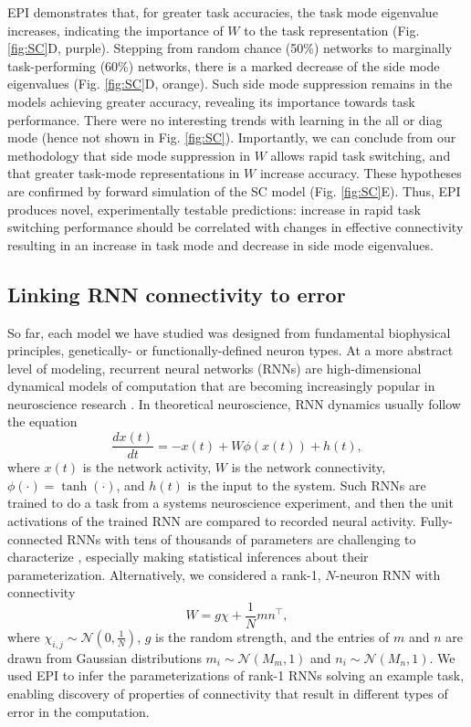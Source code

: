 \documentclass[11pt]{article}
\begin{document}
EPI demonstrates that, for greater task accuracies, the task mode eigenvalue increases, indicating the importance of $W$ to the task representation (Fig. \ref{fig:SC}D, purple).  Stepping from random chance (50\%) networks to marginally task-performing (60\%) networks, there is a marked decrease of the side mode eigenvalues (Fig. \ref{fig:SC}D, orange).  Such side mode suppression remains in the models achieving greater accuracy, revealing its importance towards task performance.   There were no interesting trends with learning in the all or diag mode (hence not shown in Fig. \ref{fig:SC}). Importantly, we can conclude from our methodology that side mode suppression in $W$ allows rapid task switching, and that greater task-mode representations in $W$ increase accuracy.  These hypotheses are confirmed by forward simulation of the SC model (Fig. \ref{fig:SC}E).  Thus, EPI produces novel, experimentally testable predictions: increase in rapid task switching performance should be correlated with changes in effective connectivity resulting in an increase in task mode and decrease in side mode eigenvalues.

\subsection{Linking RNN connectivity to error} \label{results_RNN}
So far, each model we have studied was designed from fundamental biophysical principles, genetically- or functionally-defined neuron types.  
At a more abstract level of modeling, recurrent neural networks (RNNs) are high-dimensional dynamical models of computation that are becoming increasingly popular in neuroscience research \cite{barak2017recurrent}. 
In theoretical neuroscience, RNN dynamics usually follow the equation
\begin{equation}
\frac{dx(t)}{dt} = -x(t) + W \phi(x(t)) + h(t),
\end{equation}
where $x(t)$ is the network activity, $W$ is the network connectivity, $\phi(\cdot) = \tanh(\cdot)$, and $h(t)$ is the input to the system.
Such RNNs are trained to do a task from a systems neuroscience experiment, and then the unit activations of the trained RNN are compared to recorded neural activity.
Fully-connected RNNs with tens of thousands of parameters are challenging to characterize \cite{sussillo2013opening}, especially making statistical inferences about their parameterization.
Alternatively, we considered a rank-1, $N$-neuron RNN with connectivity
\begin{equation}
W = g\chi + \frac{1}{N}mn^\top,
\end{equation}
where $\chi_{i,j} \sim \mathcal{N}(0, \frac{1}{N})$, $g$ is the random strength, and the entries of $m$ and $n$ are drawn from Gaussian distributions $m_i \sim \mathcal{N}(M_m, 1)$ and $n_i \sim \mathcal{N}(M_n, 1)$.  
We used EPI to infer the parameterizations of rank-1 RNNs solving an example task, enabling discovery of properties of connectivity that result in different types of error in the computation.
\end{document}
